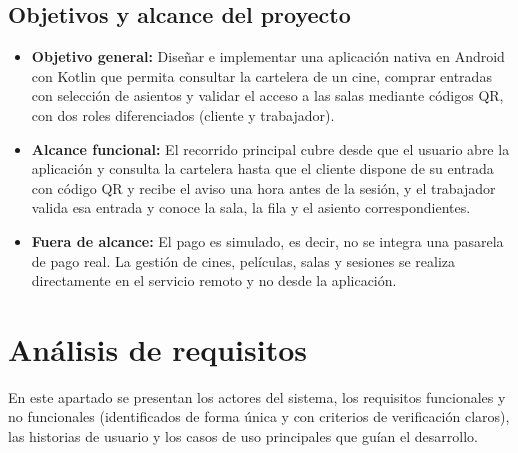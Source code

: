 \documentclass[11pt,a4paper]{article}
\begin{document}
\subsection{Objetivos y alcance del proyecto}
\begin{itemize}
    \item \textbf{Objetivo general:} Diseñar e implementar una aplicación nativa en Android con Kotlin que permita consultar la cartelera de un cine, comprar entradas con selección de asientos y validar el acceso a las salas mediante códigos QR, con dos roles diferenciados (cliente y trabajador).
    \item \textbf{Alcance funcional:} El recorrido principal cubre desde que el usuario abre la aplicación y consulta la cartelera hasta que el cliente dispone de su entrada con código QR y recibe el aviso una hora antes de la sesión, y el trabajador valida esa entrada y conoce la sala, la fila y el asiento correspondientes.
    \item \textbf{Fuera de alcance:} El pago es simulado, es decir, no se integra una pasarela de pago real. La gestión de cines, películas, salas y sesiones se realiza directamente en el servicio remoto y no desde la aplicación.
\end{itemize}

\newpage

\section{Análisis de requisitos}
En este apartado se presentan los actores del sistema, los requisitos funcionales y no funcionales (identificados de forma única y con criterios de verificación claros), las historias de usuario y los casos de uso principales que guían el desarrollo.
\end{document}
